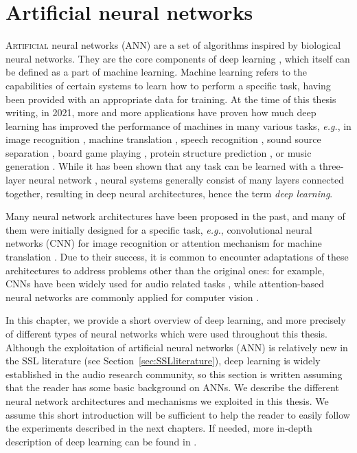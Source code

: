 \chapter{Artificial neural networks}
\label{chap:neuralNetworks}

\lettrine{A}{rtificial} neural networks (ANN) are a set of algorithms inspired by biological neural networks. They are the core components of deep learning \cite{goodfellow_deep_2016}, which itself can be defined as a part of machine learning. Machine learning refers to the capabilities of certain systems to learn how to perform a specific task, having been provided with an appropriate data for training. At the time of this thesis writing, in 2021, more and more applications have proven how much deep learning has improved the performance of machines in many various tasks, \emph{e.g.}, in image recognition \cite{he_deep_2016}, machine translation \cite{vaswani_attention_2017}, speech recognition \cite{hinton_deep_2012}, sound source separation \cite{hennequin_spleeter_2020}, board game playing \cite{silver_mastering_2017}, protein structure prediction \cite{jumper_highly_2021}, or music generation \cite{hadjeres_deepbach_2017}. While it has been shown that any task can be learned with a three-layer neural network \cite{hornik_multilayer_1989}, neural systems generally consist of many layers connected together, resulting in deep neural architectures, hence the term \textit{deep learning}. 

Many neural network architectures have been proposed in the past, and many of them were initially designed for a specific task, \emph{e.g.}, convolutional neural networks (CNN) for image recognition \cite{lecun_backpropagation_1989} or attention mechanism for machine translation \cite{he_deep_2016}. Due to their success, it is common to encounter adaptations of these architectures to address problems other than the original ones: for example, CNNs have been widely used for audio related tasks \cite{purwins_deep_2019}, while attention-based neural networks are commonly applied for computer vision \cite{dosovitskiy_image_2021}.

In this chapter, we provide a short overview of deep learning, and more precisely of different types of neural networks which were used throughout this thesis. Although the exploitation of artificial neural networks (ANN) is relatively new in the SSL literature (see Section~\ref{sec:SSLliterature}), deep learning is widely established in the audio research community, so this section is written assuming that the reader has some basic background on ANNs. We describe the different neural network architectures and mechanisms we exploited in this thesis. We assume this short introduction will be sufficient to help the reader to easily follow the experiments described in the next chapters. If needed, more in-depth description of deep learning can be found in \cite{goodfellow_deep_2016}. 

